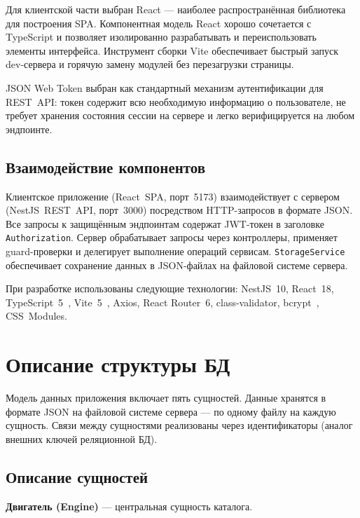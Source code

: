 \documentclass[14pt,a4paper]{extarticle}
\begin{document}
Для клиентской части выбран React --- наиболее распространённая библиотека для построения SPA. Компонентная модель React хорошо сочетается с TypeScript и позволяет изолированно разрабатывать и переиспользовать элементы интерфейса. Инструмент сборки Vite обеспечивает быстрый запуск dev-сервера и горячую замену модулей без перезагрузки страницы.

JSON Web Token выбран как стандартный механизм аутентификации для REST~API: токен содержит всю необходимую информацию о пользователе, не требует хранения состояния сессии на сервере и легко верифицируется на любом эндпоинте.

\subsection{Взаимодействие компонентов}

Клиентское приложение (React~SPA, порт~5173) взаимодействует с сервером (NestJS~REST~API, порт~3000) посредством HTTP-запросов в формате JSON. Все запросы к защищённым эндпоинтам содержат JWT-токен в заголовке \texttt{Authorization}. Сервер обрабатывает запросы через контроллеры, применяет guard-проверки и делегирует выполнение операций сервисам. \texttt{StorageService} обеспечивает сохранение данных в JSON-файлах на файловой системе сервера.

При разработке использованы следующие технологии: NestJS~10, React~18, TypeScript~5~\cite{typescript}, Vite~5~\cite{vite}, Axios, React Router~6, class-validator, bcrypt~\cite{bcrypt}, CSS~Modules.

\newpage

\section{Описание структуры БД}

Модель данных приложения включает пять сущностей. Данные хранятся в формате JSON на файловой системе сервера --- по одному файлу на каждую сущность. Связи между сущностями реализованы через идентификаторы (аналог внешних ключей реляционной БД).

\subsection{Описание сущностей}

\textbf{Двигатель (Engine)} --- центральная сущность каталога.
\end{document}
